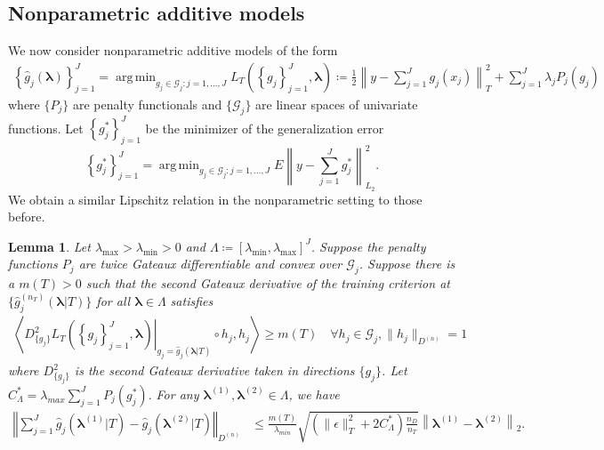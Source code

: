 \documentclass[12pt]{article} %
\newtheorem{lemma}{Lemma}
\theoremstyle{definition}
\DeclareMathOperator*{\argmin}{arg\,min}
\begin{document}
\subsection{Nonparametric additive models}
\label{sec:nonparam_smooth}

We now consider nonparametric additive models of the form
\begin{align}
\label{eq:train_crit_nonparam}
\left\{ \hat{g}_j( \boldsymbol \lambda) \right \}_{j=1}^J
=
\argmin_{g_j\in \mathcal{G}_j: j=1,...,J}  L_T\left (\left \{ g_j \right \}_{j=1}^J, \boldsymbol{\lambda} \right )
\coloneqq
\frac{1}{2} \left \| y -  \sum_{j=1}^J g_j(x_j) \right \|^2_T 
+ \sum_{j=1}^J \lambda_j P_j(g_j)
\end{align}
where $\{P_j\}$ are penalty functionals and $\{\mathcal{G}_j\}$ are linear spaces of univariate functions.
Let $\left\{ g_j^* \right \}_{j=1}^J$ be the minimizer of the generalization error
\begin{equation}
\left\{ g_j^* \right \}_{j=1}^J = \argmin_{g_j \in \mathcal{G}_j: j=1,...,J}
E \left \| y - \sum_{j=1}^J g_j^* \right \|^2_{L_2}.
\end{equation}
We obtain a similar Lipschitz relation in the nonparametric setting to those before.
\begin{lemma}
	\label{lemma:nonparam_smooth}
	Let $\lambda_{\max} > \lambda_{\min} > 0 $ and $\Lambda \coloneqq [\lambda_{\min}, \lambda_{\max}]^J$.
	Suppose the penalty functions $P_{j}$ are twice Gateaux differentiable and convex over $\mathcal{G}_j$.
	Suppose there is a $m(T) > 0$ such that the second Gateaux derivative of the training criterion at $\{\hat{g}^{(n_T)}_j( \boldsymbol{\lambda} | T)\}$ for all $\boldsymbol{\lambda} \in \Lambda$ satisfies
	\begin{align}
	\left \langle 
	\left . D^2_{\{g_j\}} L_T \left ( \left \{ g_j \right \}_{j=1}^J, \boldsymbol{\lambda} \right ) \right |_{g_j= \hat{g}_j( \boldsymbol{\lambda} | T) }
	\circ h_j, h_j
	\right \rangle 
	\ge m(T)
	\quad \forall h_j \in \mathcal{G}_j,  \|h_j \|_{D^{(n)}} = 1
	\label{eq:gateuax}
	\end{align}
	where $D^2_{\{g_j\}}$ is the second Gateaux derivative taken in directions $\{g_j\}$.
	Let $
	C_{\Lambda}^*= \lambda_{max}\sum_{j=1}^{J} P_{j}(g^*_j).
	$
	For any $\boldsymbol{\lambda}^{(1)}, \boldsymbol{\lambda}^{(2)} \in \Lambda$, we have
	\begin{align}
	\label{eq:nonparam_lipshitz_thrm}
	\left\Vert 
	\sum_{j=1}^J \hat{g}_j\left(\boldsymbol{\lambda}^{(1)} |T \right)-\hat{g}_j\left(\boldsymbol{\lambda}^{(2)} |T \right)\right\Vert _{D^{(n)}} & \le
	\frac{m(T)}{\lambda_{min}}
	\sqrt{
		\left(
		\|\epsilon\|_T^2 + 2 C^*_\Lambda
		\right)
		\frac{n_{D}}{n_{T}}
	}
	\left \|\boldsymbol{\lambda}^{(1)}-\boldsymbol{\lambda}^{(2)} \right \|_2.
	\end{align}
\end{lemma}
\end{document}
